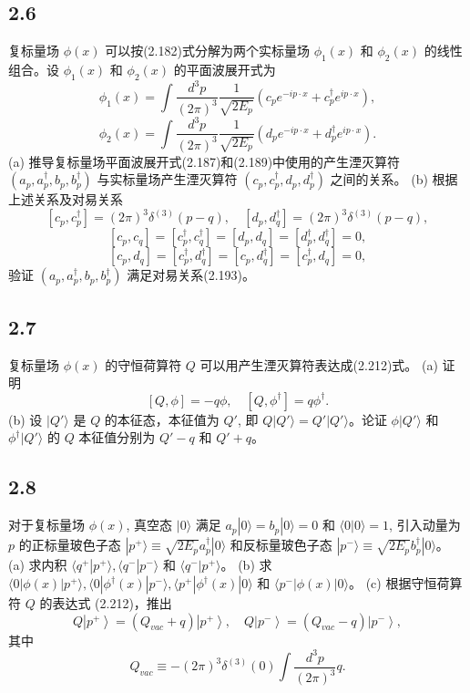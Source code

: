 \newpage
\subsection{2.6}
复标量场 $\phi(x)$ 可以按(2.182)式分解为两个实标量场 $\phi_1(x)$ 和 $\phi_2(x)$ 的线性组合。设 $\phi_1(x)$ 和 $\phi_2(x)$ 的平面波展开式为
$$\phi_1(x) = \int \frac{d^3p}{(2\pi)^3} \frac{1}{\sqrt{2E_p}} (c_p e^{-ip\cdot x} + c_p^\dagger e^{ip\cdot x}),$$
$$\phi_2(x) = \int \frac{d^3p}{(2\pi)^3} \frac{1}{\sqrt{2E_p}} (d_p e^{-ip\cdot x} + d_p^\dagger e^{ip\cdot x}). \tag{2.229}$$
(a) 推导复标量场平面波展开式(2.187)和(2.189)中使用的产生湮灭算符 $(a_p, a_p^\dagger, b_p, b_p^\dagger)$ 与实标量场产生湮灭算符 $(c_p, c_p^\dagger, d_p, d_p^\dagger)$ 之间的关系。
(b) 根据上述关系及对易关系
$$[c_p, c_p^\dagger] = (2\pi)^3 \delta^{(3)} (p-q), \quad [d_p, d_q^\dagger] = (2\pi)^3 \delta^{(3)} (p-q),$$
$$[c_p, c_q] = [c_p^\dagger, c_q^\dagger] = [d_p, d_q] = [d_p^\dagger, d_q^\dagger] = 0,$$
$$[c_p, d_q] = [c_p^\dagger, d_q^\dagger] = [c_p, d_q^\dagger] = [c_p^\dagger, d_q] = 0,$$
验证 $(a_p, a_p^\dagger, b_p, b_p^\dagger)$ 满足对易关系(2.193)。

\newpage
\subsection{2.7}
复标量场 $\phi(x)$ 的守恒荷算符 $Q$ 可以用产生湮灭算符表达成(2.212)式。
(a) 证明
$$[Q, \phi] = -q\phi, \quad [Q, \phi^\dagger] = q\phi^\dagger. \tag{2.232}$$
(b) 设 $|Q'\rangle$ 是 $Q$ 的本征态，本征值为 $Q'$, 即 $Q | Q' \rangle = Q' | Q' \rangle$。论证 $\phi | Q' \rangle$ 和 $\phi^\dagger | Q' \rangle$ 的 $Q$ 本征值分别为 $Q' - q$ 和 $Q' + q$。

\newpage
\subsection{2.8}
对于复标量场 $\phi(x)$, 真空态 $|0\rangle$ 满足 $a_p |0\rangle = b_p |0\rangle = 0$ 和 $\langle 0|0\rangle = 1$, 引入动量为 $p$ 的正标量玻色子态 $|p^+ \rangle \equiv \sqrt{2E_p} a_p^\dagger |0\rangle$ 和反标量玻色子态 $|p^- \rangle \equiv \sqrt{2E_p} b_p^\dagger |0\rangle$。
(a) 求内积 $\langle q^+ | p^+ \rangle, \langle q^- | p^- \rangle$ 和 $\langle q^- | p^+ \rangle$。
(b) 求 $\langle 0| \phi(x) | p^+ \rangle, \langle 0| \phi^\dagger(x) | p^- \rangle, \langle p^+ | \phi^\dagger(x) | 0\rangle$ 和 $\langle p^- | \phi(x) | 0\rangle$。
(c) 根据守恒荷算符 $Q$ 的表达式 (2.212)，推出
$$Q \left| p^+ \right\rangle = (Q_{vac} + q) \left| p^+ \right\rangle, \quad Q \left| p^- \right\rangle = (Q_{vac} - q) \left| p^- \right\rangle,$$
其中
$$Q_{vac} \equiv -(2\pi)^3 \delta^{(3)} (0) \int \frac{d^3p}{(2\pi)^3} q. \tag{2.233}$$

